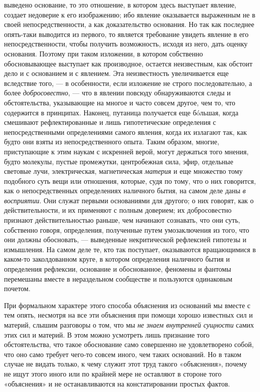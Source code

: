 выведено основание, то это отношение, в котором здесь выступает явление,
создает недоверие к его изображению; ибо явление оказывается выраженным не
в своей непосредственности, а как доказательство основания. Но так как
последнее опять-таки выводится из первого, то является требование увидеть
явление в его непосредственности, чтобы получить возможность, исходя из
него, дать оценку основания. Поэтому при таком изложении, в котором
собственно обосновывающее выступает как производное, остается неизвестным,
как обстоит дело и с основанием и с явлением. Эта неизвестность
увеличивается еще вследствие того, — в особенности, если изложение не
строго последовательно, а более {\em добросовестно}, —
что в явлении повсюду обнаруживаются следы и обстоятельства, указывающие на
многое и часто совсем другое, чем то, что содержится в принципах. Наконец,
путаница получается еще бóльшая, когда смешивают рефлектированные и лишь
гипотетические определения с непосредственными определениями самого
явления, когда их излагают так, как будто они взяты из непосредственного
опыта. Таким образом, многие, приступающие к этим наукам с искренней верой,
могут держаться того мнения, будто молекулы, пустые промежутки,
центробежная сила, эфир, отдельные световые лучи, электрическая,
магнетическая {\em материя} и еще множество тому
подобного суть вещи или отношения, которые, судя по тому, что о них
говорится, как о непосредственных определениях наличного бытия, на самом
деле даны {\em в восприятии}. Они служат первыми
основаниями для другого; о них говорят, как о действительности, и их
применяют с полным доверием; их добросовестно признают действительностью
раньше, чем начинают сознавать, что они суть, собственно говоря,
определения, полученные путем умозаключения из того, что они должны
обосновать, — выведенные некритической рефлексией гипотезы и измышления. На
самом деле те, кто так поступает, оказываются вращающимися в каком-то
заколдованном круге, в котором определения наличного бытия и определения
рефлексии, основание и обоснованное, феномены и фантомы перемешаны вместе в
нераздельном сообществе и пользуются одинаковым почетом.

При формальном характере этого способа объяснения из оснований мы вместе с
тем опять, несмотря на все эти объяснения при помощи хорошо известных сил и
материй, слышим разговоры о том, что мы {\em не знаем
внутренней сущности} самих этих сил и материй. В этом можно усмотреть лишь
признание того обстоятельства, что такое обоснование само совершенно не
удовлетворено собой, что оно само требует чего-то совсем иного, чем таких
оснований. Но в таком случае не видать только, к чему служит этот труд
такого «объяснения», почему не ищут этого иного или по крайней мере не
оставляют в стороне того «объяснения» и не останавливаются на
констатировании простых фактов.

